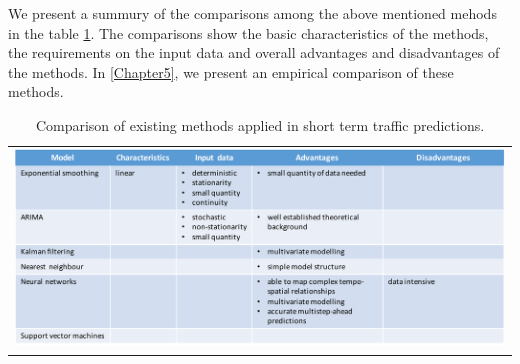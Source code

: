 We present a summury of the comparisons among the above mentioned mehods in the table
\ref{table:comparisonExistingMethods}. The comparisons show the basic characteristics of the methods,
the requirements on the input data and overall advantages and disadvantages of the methods. In
\ref{Chapter5}, we present an empirical comparison of these methods.

\begin{table}
    \begin{tabular}{c}
        \includegraphics[width=\textwidth,height=\textheight,keepaspectratio]{Figures/method-comparisons.pdf}
    \end{tabular}
    \caption[Comparison of existing methods]{Comparison of existing methods applied in short term
     traffic predictions.}
    \label{table:comparisonExistingMethods}
\end{table}